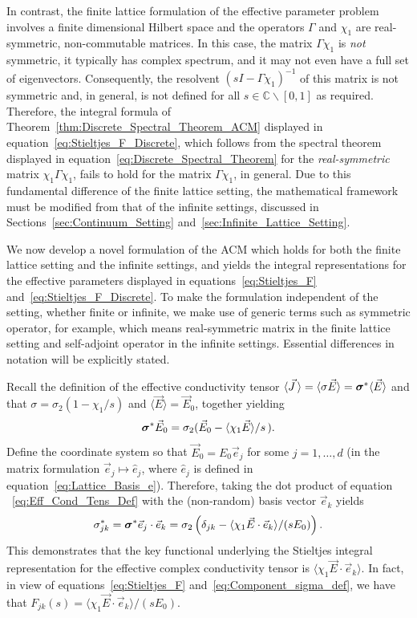 \documentclass{cmslatex}
\newcommand\bsig{\mbox{\boldmath${\sigma}$}}
\begin{document}
In contrast, the finite lattice formulation of the effective parameter
problem involves a finite dimensional Hilbert space and the operators
$\Gamma$ and $\chi_1$ are real-symmetric, non-commutable matrices. In this
case, the matrix $\Gamma\chi_1$ is \emph{not} symmetric, it typically has
complex spectrum, and it may not even have a full set of
eigenvectors. Consequently, the resolvent $(sI-\Gamma\chi_1)^{-1}$ of this
matrix is not symmetric and, in general, is 
not defined for all $s\in\mathbb{C}\backslash[0,1]$ as required. Therefore, the
integral formula of Theorem~\ref{thm:Discrete_Spectral_Theorem_ACM}
displayed in equation~\eqref{eq:Stieltjes_F_Discrete}, which follows
from the spectral theorem displayed in
equation~\eqref{eq:Discrete_Spectral_Theorem} for the 
\emph{real-symmetric} matrix $\chi_1\Gamma\chi_1$, fails to hold for the matrix
$\Gamma\chi_1$, in general. Due to this fundamental difference of the finite
lattice setting, the mathematical framework must be 
modified from that of the infinite settings, discussed in
Sections~\ref{sec:Continuum_Setting}
and~\ref{sec:Infinite_Lattice_Setting}. 



We now develop a novel formulation of the ACM which holds for both the
finite lattice setting and the infinite settings, and yields the
integral representations for the effective parameters displayed in
equations~\eqref{eq:Stieltjes_F}
and~\eqref{eq:Stieltjes_F_Discrete}. To make the formulation
independent of the setting, whether finite or infinite, we make use of generic
terms such as symmetric operator, for example, which means
real-symmetric matrix in the finite lattice setting and self-adjoint
operator in the infinite settings. Essential differences in notation
will be explicitly stated.



Recall the definition of the effective conductivity tensor
$\langle\vec{J}\,\rangle=\langle\sigma\vec{E}\rangle=\bsig^*\langle\vec{E}\rangle$ and that $\sigma=\sigma_2(1-\chi_1/s)$ and
$\langle\vec{E}\rangle=\vec{E}_0$, together yielding  
% 
\begin{align}\label{eq:Eff_Cond_Tens_Def}
  \bsig^*\vec{E}_0=\sigma_2(\vec{E}_0 -\langle\chi_1\vec{E}\rangle/s\,).
\end{align}
%
Define the coordinate system so that $\vec{E}_0=E_0\vec{e}_j$ for
some $j=1,\ldots,d$ (in the matrix formulation
$\vec{e}_j\mapsto\hat{e}_j$, where $\hat{e}_j$ is defined in
equation~\eqref{eq:Lattice_Basis_e}). Therefore, taking the dot
product of equation ~\eqref{eq:Eff_Cond_Tens_Def} with the
(non-random) basis vector $\vec{e}_k$ yields 
%
\begin{align}\label{eq:Component_sigma_def}
  \sigma^*_{jk}=\bsig^*\vec{e}_j\cdot\vec{e}_k=\sigma_2\left(\delta_{jk}-\langle\chi_1\vec{E}\cdot\vec{e}_k\rangle/(sE_0)\right). 
\end{align}
%
This demonstrates that the key functional underlying the Stieltjes
integral representation for the effective complex conductivity tensor
is $\langle\chi_1\vec{E}\cdot\vec{e}_k\rangle$. In fact, in view of
equations~\eqref{eq:Stieltjes_F} and~\eqref{eq:Component_sigma_def},
we have that $F_{jk}(s)=\langle\chi_1\vec{E}\cdot\vec{e}_k\rangle/(sE_0)$. 
\end{document}

